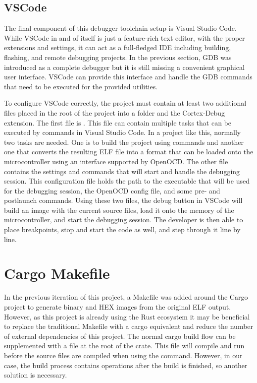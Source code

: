 \subsection{VSCode}

The final component of this debugger toolchain setup is Visual Studio Code. While VSCode in and of itself is just a feature-rich text editor, with the proper extensions and settings, it can act as a full-fledged IDE including building, flashing, and remote debugging projects. In the previous section, GDB was introduced as a complete debugger but it is still missing a convenient graphical user interface. VSCode can provide this interface and handle the GDB commands that need to be executed for the provided utilities.

To configure VSCode correctly, the project must contain at least two additional files placed in the root of the project into a  folder and the Cortex-Debug extension. \cite{CortexDebug} The first file is . This file can contain multiple tasks that can be executed by commands in Visual Studio Code. In a project like this, normally two tasks are needed. One is to build the project using  commands and another one that converts the resulting ELF file into a format that can be loaded onto the microcontroller using an interface supported by OpenOCD. The other file  contains the settings and commands that will start and handle the debugging session. This configuration file holds the path to the executable that will be used for the debugging session, the OpenOCD config file, and some pre- and postlaunch commands. Using these two files, the debug button in VSCode will build an image with the current source files, load it onto the memory of the microcontroller, and start the debugging session. The developer is then able to place breakpoints, stop and start the code as well, and step through it line by line.

\section{Cargo Makefile}

In the previous iteration of this project, a Makefile was added around the Cargo project to generate binary and HEX images from the original ELF output. However, as this project is already using the Rust ecosystem it may be beneficial to replace the traditional Makefile with a cargo equivalent and reduce the number of external dependencies of this project. The normal cargo build flow can be supplemented with a  file at the root of the crate. This file will compile and run before the source files are compiled when using the  command. However, in our case, the build process contains operations after the build is finished, so another solution is necessary.

